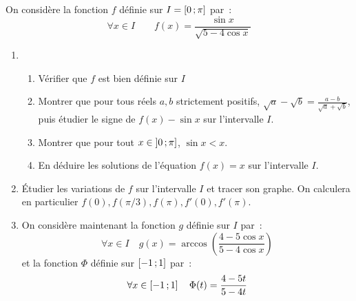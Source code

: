 \begin{exercice}[Problème]
  On considère la fonction \(f\) définie sur \(I = \left[ 0 \, ; {} \pi \right]\) par~:
  \begin{equation}
    \forall x \in I \qquad f(x) = \frac{\sin x}{\sqrt{5-4\cos x}}
  \end{equation}
  \begin{enumerate}
    \item \begin{enumerate}
        \item Vérifier que \(f\) est bien définie sur \(I\)
        \item Montrer que pour tous réels \(a, b\) strictement positifs, 
          \(\sqrt{a} - \sqrt{b} = \frac{a-b}{\sqrt{a}+\sqrt{b}}\), puis étudier 
          le signe de \(f(x) - \sin x\) sur l'intervalle \(I\).
        \item Montrer que pour tout \(x \in \left] 0 \, ; {} \pi \right]\), \(\sin x < 
          x\).
        \item En déduire les solutions de l'équation \(f(x) = x\) sur 
          l'intervalle \(I\).
    \end{enumerate}
  \item Étudier les variations de \(f\) sur l'intervalle \(I\) et tracer son 
    graphe. On calculera en particulier \(f(0), f(\pi/3), f(\pi), f'(0), 
    f'(\pi)\).
  \item On considère maintenant la fonction \(g\) définie sur \(I\) par~:
    \begin{equation}
      \forall x \in I \quad g(x) = \arccos\left(\frac{4-5\cos x}{5-4\cos 
      x}\right)
    \end{equation}
    et la fonction \(\Phi\) définie sur \(\left[ -1 \, ; {} 1 \right]\) par~:
    \begin{equation}
      \forall x \in \left[ -1 \, ; {} 1 \right] \quad \Phi(t) = \frac{4-5t}{5-4t}
    \end{equation}
\end{enumerate}
\end{exercice}

